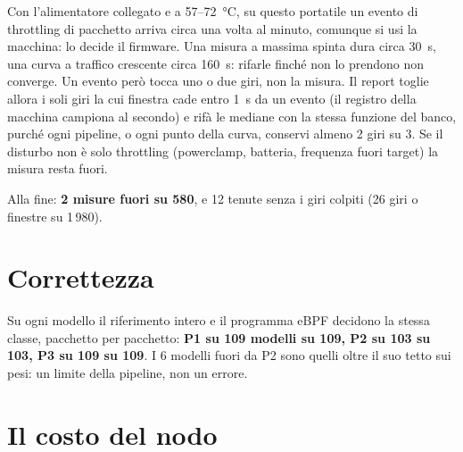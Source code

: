 \documentclass[11pt,a4paper,oneside]{report}
\begin{document}
\begin{prima}
Con l'alimentatore collegato e a 57--72~°C, su questo portatile un evento di
throttling di pacchetto arriva circa una volta al minuto, comunque si usi la
macchina: lo decide il firmware. Una misura a massima spinta dura circa 30~s,
una curva a traffico crescente circa 160~s: rifarle finché non lo prendono non
converge. Un evento però tocca uno o due giri, non la misura. Il report toglie
allora i soli giri la cui finestra cade entro 1~s da un evento (il registro
della macchina campiona al secondo) e rifà le mediane con la stessa funzione
del banco, purché ogni pipeline, o ogni punto della curva, conservi almeno 2
giri su 3. Se il disturbo non è solo throttling (powerclamp, batteria,
frequenza fuori target) la misura resta fuori.
\end{prima}

Alla fine: \textbf{2 misure fuori su 580}, e 12 tenute senza i giri colpiti
(26 giri o finestre su 1\,980).

\section{Correttezza}

Su ogni modello il riferimento intero e il programma eBPF decidono la stessa
classe, pacchetto per pacchetto: \textbf{P1 su 109 modelli su 109, P2 su 103
su 103, P3 su 109 su 109}. I 6 modelli fuori da P2 sono quelli oltre il suo tetto sui
pesi: un limite della pipeline, non un errore.

\section{Il costo del nodo}
\end{document}
